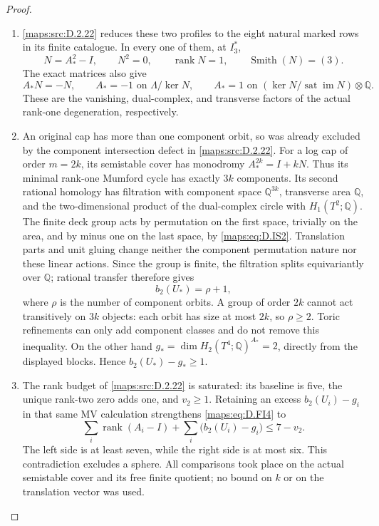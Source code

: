 \begin{proof}
\begin{enumerate}[label=\arabic*.,leftmargin=*]
\item \ref{maps:src:D.2.22} reduces these two profiles to the eight natural marked rows
in its finite catalogue. In every one of them, at $I_3^*$,
\[
 N=A_*^2-I,\qquad N^2=0,\qquad \operatorname{rank}N=1,
 \qquad \operatorname{Smith}(N)=(3).                         \tag{D.IS1}\label{maps:eq:D.IS1}
\]
The exact matrices also give
\[
 A_*N=-N,\qquad
 A_*=-1\text{ on }\Lambda/\ker N,\qquad
 A_*=1\text{ on }(\ker N/\operatorname{sat}\operatorname{im}N)
                         \otimes\mathbb Q.                 \tag{D.IS2}\label{maps:eq:D.IS2}
\]
These are the vanishing, dual-complex, and transverse factors of the
actual rank-one degeneration, respectively.

\item An original cap has more than one component orbit, so was already
excluded by the component intersection defect in \ref{maps:src:D.2.22}. For a log
cap of order $m=2k$, its semistable cover has monodromy
$A_*^{2k}=I+kN$. Thus its minimal rank-one Mumford cycle has exactly
$3k$ components. Its second rational homology has filtration with
component space $\mathbb Q^{3k}$, transverse area $\mathbb Q$, and
the two-dimensional product of the dual-complex circle with
$H_1(T^2;\mathbb Q)$. The finite deck group acts by permutation on
the first space, trivially on the area, and by minus one on the last
space, by \eqref{maps:eq:D.IS2}. Translation parts and unit gluing change neither
the component permutation nature nor these linear actions. Since the
group is finite, the filtration splits equivariantly over $\mathbb Q$;
rational transfer therefore gives
\[
                         b_2(U_*)=\rho+1,
\]
where $\rho$ is the number of component orbits. A group of order
$2k$ cannot act transitively on $3k$ objects: each orbit has size at
most $2k$, so $\rho\ge2$. Toric refinements can only add component
classes and do not remove this inequality. On the other hand
$g_*=\dim H_2(T^4;\mathbb Q)^{A_*}=2$, directly from the displayed
blocks. Hence $b_2(U_*)-g_*\ge1$.

\item The rank budget of \ref{maps:src:D.2.22} is saturated: its baseline is five, the
unique rank-two zero adds one, and $v_2\ge1$. Retaining an excess
$b_2(U_i)-g_i$ in that same MV calculation strengthens \eqref{maps:eq:D.FI4} to
\[
 \sum_i\operatorname{rank}(A_i-I)
 +\sum_i\bigl(b_2(U_i)-g_i\bigr)\le7-v_2.
\]
The left side is at least seven, while the right side is at most
six. This contradiction excludes a sphere. All comparisons took
place on the actual semistable cover and its free finite quotient;
no bound on $k$ or on the translation vector was used.
\end{enumerate}
\end{proof}


